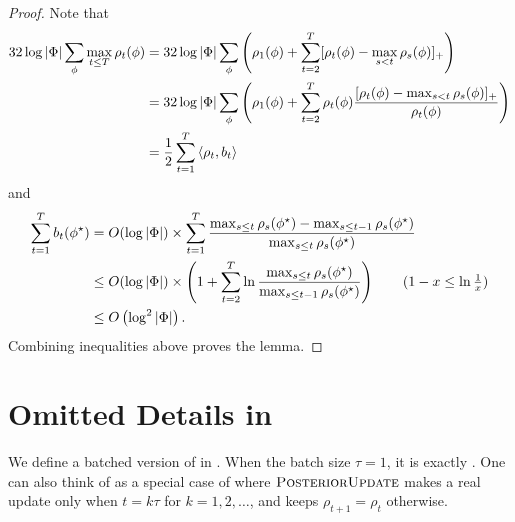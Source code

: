 \begin{proof}
Note that 
\begin{align*}
    32\log|\Phi|\sum_{\phi}\max_{t \le T} \rho_{t}(\phi)  
    &= 32\log|\Phi|  \sum_{\phi}\left(\rho_1(\phi) +\sum_{t=2}^T [\rho_t(\phi)-\max_{s<t}\rho_s(\phi)]_+\right)
    \\&= 32\log|\Phi|   \sum_{\phi}\left(\rho_1(\phi) +\sum_{t=2}^T \rho_t(\phi)\frac{[\rho_t(\phi)-\max_{s<t}\rho_s(\phi)]_+}{\rho_t(\phi)}\right)
    \\&= \frac{1}{2} \sum_{t=1}^T \left\langle\rho_t, b_t\right\rangle  
\end{align*}
and 
\begin{align*}
    \sum_{t=1}^T b_t(\phi^\star) 
    &= O(\log|\Phi|)\times \sum_{t=1}^T \frac{\max_{s\leq t}\rho_s(\phi^\star) - \max_{s\leq t-1}\rho_s(\phi^\star)}{\max_{s\leq t}\rho_s(\phi^\star)} \\
    &\leq O(\log|\Phi|)\times \left(1+\sum_{t=2}^T  \ln \frac{\max_{s\leq t}\rho_s(\phi^\star)}{\max_{s\leq t-1} \rho_s(\phi^\star)}\right) \tag{$1-x\leq \ln \frac{1}{x}$}\\
    &\leq O\left(\log^2|\Phi|\right). 
\end{align*}
Combining inequalities above proves the lemma. 

\end{proof}





\newpage
\section{Omitted Details in }
\label{app:model-free stoc}
We define a batched version of  in . When the batch size $\tau=1$, it is exactly . One can also think of  as a special case of  where $\textsc{PosteriorUpdate}$ makes a real update only when $t=k\tau$ for $k=1,2,\ldots$, and keeps $\rho_{t+1}=\rho_t$ otherwise. 

